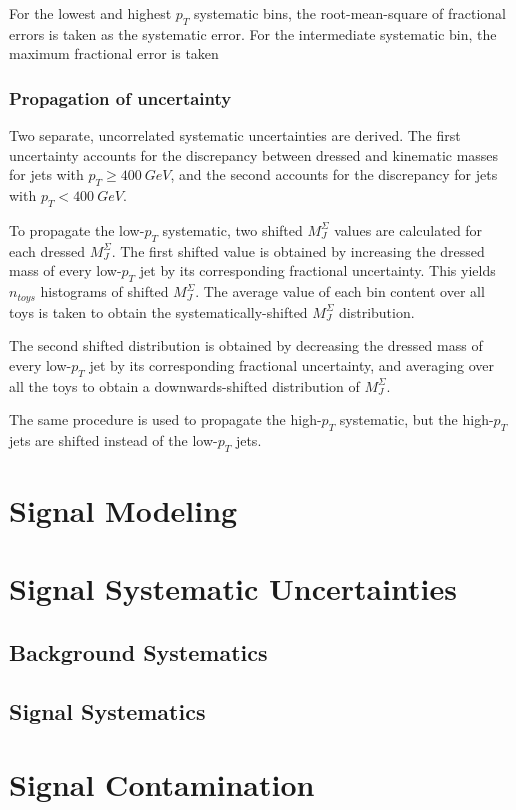 For the lowest and highest $p_T$ systematic bins, the root-mean-square
of fractional errors is taken as the systematic error. For the
intermediate systematic bin, the maximum fractional error is taken

\subsubsection{Propagation of uncertainty}
Two separate, uncorrelated systematic uncertainties are derived. The first
uncertainty accounts for the discrepancy between dressed and kinematic
masses for jets with $p_T \geq 400~GeV$, and the second accounts for the
discrepancy for jets with $p_T < 400~GeV$.

To propagate the low-$p_T$ systematic, two shifted $M_{J}^{\Sigma}$
values are calculated for each dressed $M_{J}^{\Sigma}$. The first
shifted value is obtained by increasing the dressed mass of every
low-$p_T$ jet by its corresponding fractional uncertainty. This yields
$n_{toys}$ histograms of shifted $M_{J}^{\Sigma}$. The average value
of each bin content over all toys is taken to obtain the
systematically-shifted $M_{J}^{\Sigma}$ distribution. 

The second
shifted distribution is obtained by decreasing the dressed mass of every
low-$p_T$ jet by its corresponding fractional uncertainty, and
averaging over all the toys to obtain a downwards-shifted distribution
of $M_{J}^{\Sigma}$. 

The same procedure is used to propagate the high-$p_T$ systematic, but
the high-$p_T$ jets are shifted instead of the low-$p_T$ jets.

\section{Signal Modeling}
\section{Signal Systematic Uncertainties}
\subsection{Background Systematics}
\subsection{Signal Systematics}
\section{Signal Contamination}
